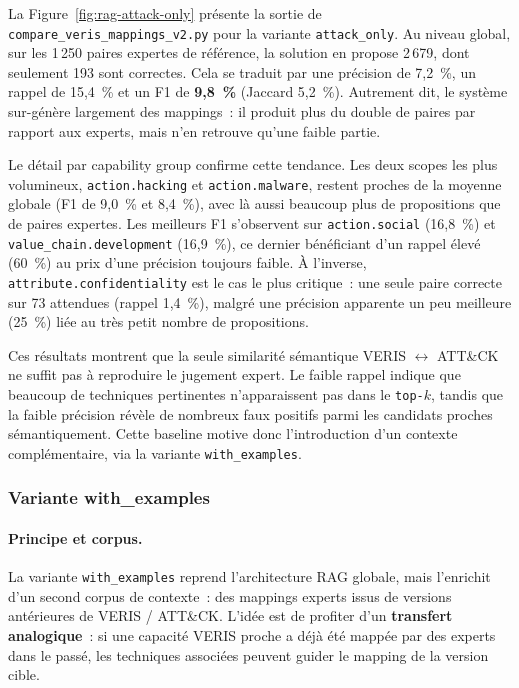 \documentclass[a4paper,12pt]{article}
\begin{document}
La Figure~\ref{fig:rag-attack-only} présente la sortie de
\texttt{compare\_veris\_mappings\_v2.py} pour la variante
\texttt{attack\_only}. Au niveau global, sur les 1\,250 paires expertes de
référence, la solution en propose 2\,679, dont seulement 193 sont correctes.
Cela se traduit par une précision de 7,2~\%, un rappel de 15,4~\% et un F1 de
\textbf{9,8~\%} (Jaccard 5,2~\%). Autrement dit, le système sur-génère
largement des mappings~: il produit plus du double de paires par rapport aux
experts, mais n'en retrouve qu'une faible partie.

Le détail par capability group confirme cette tendance. Les deux scopes les
plus volumineux, \texttt{action.hacking} et \texttt{action.malware}, restent
proches de la moyenne globale (F1 de 9,0~\% et 8,4~\%), avec là aussi
beaucoup plus de propositions que de paires expertes. Les meilleurs F1
s'observent sur \texttt{action.social} (16,8~\%) et
\texttt{value\_chain.development} (16,9~\%), ce dernier bénéficiant d'un
rappel élevé (60~\%) au prix d'une précision toujours faible. À l'inverse,
\texttt{attribute.confidentiality} est le cas le plus critique~: une seule
paire correcte sur 73 attendues (rappel 1,4~\%), malgré une précision
apparente un peu meilleure (25~\%) liée au très petit nombre de propositions.

Ces résultats montrent que la seule similarité sémantique VERIS
$\leftrightarrow$ ATT\&CK ne suffit pas à reproduire le jugement expert. Le
faible rappel indique que beaucoup de techniques pertinentes n'apparaissent
pas dans le \texttt{top-$k$}, tandis que la faible précision révèle de
nombreux faux positifs parmi les candidats proches sémantiquement. Cette
baseline motive donc l'introduction d'un contexte complémentaire, via la
variante \texttt{with\_examples}.

\subsubsection{Variante with\_examples}

\paragraph{Principe et corpus.}
La variante \texttt{with\_examples} reprend l'architecture RAG globale, mais
l'enrichit d'un second corpus de contexte~: des mappings experts issus de
versions antérieures de VERIS / ATT\&CK. L'idée est de profiter d'un
\textbf{transfert analogique}~: si une capacité VERIS proche a déjà été mappée
par des experts dans le passé, les techniques associées peuvent guider le
mapping de la version cible.
\end{document}
